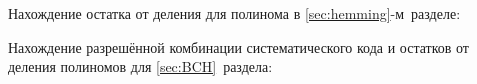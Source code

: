 \newpage
{} 

Нахождение остатка от деления для полинома в
\ref{sec:hemming}-м~разделе:  



Нахождение разрешённой комбинации систематического кода и остатков от
деления полиномов для \ref{sec:BCH}~раздела:

 
\newpage



